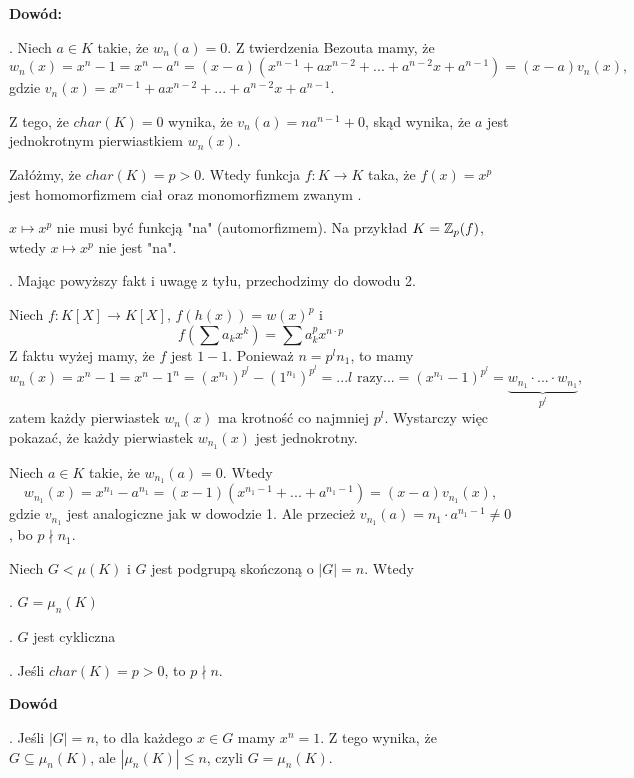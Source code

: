 \textbf{Dowód:}

. Niech $a\in K$ takie, że $w_n(a)=0$. Z twierdzenia Bezouta mamy, że
$$w_n(x)=x^n-1=x^n-a^n=(x-a)(x^{n-1}+ax^{n-2}+...+a^{n-2}x+a^{n-1})=(x-a)v_n(x),$$
gdzie $v_n(x)=x^{n-1}+ax^{n-2}+...+a^{n-2}x+a^{n-1}$.

Z tego, że $char(K)=0$ wynika, że $v_n(a)=na^{n-1}+0$, skąd wynika, że $a$ jest jednokrotnym pierwiastkiem $w_n(x)$.

\begin{fakt}
    Załóżmy, że $char(K)=p>0$. Wtedy funkcja $f:K\to K$ taka, że $f(x)=x^p$ jest homomorfizmem ciał oraz monomorfizmem zwanym .
\end{fakt}

\begin{uwaga}
    $x\mapsto x^p$ nie musi być funkcją "na" (automorfizmem). Na przykład $K=\mathbb{Z}_p(f)$, wtedy $x\mapsto x^p$ nie jest "na".
\end{uwaga}

. Mając powyższy fakt i uwagę z tyłu, przechodzimy do dowodu 2.

Niech $f:K[X]\to K[X]$, $f(h(x))=w(x)^p$ i 
$$f(\sum a_kx^k)=\sum a_k^px^{n\cdot p}$$
Z faktu wyżej mamy, że $f$ jest $1-1$. Ponieważ $n=p^ln_1$, to mamy 
$$w_n(x)=x^n-1=x^n-1^n=(x^{n_1})^{p^l}-(1^{n_1})^{p^l}=...l\text{ razy}...=(x^{n_1}-1)^{p^l}=\underbrace{w_{n_1}\cdot...\cdot w_{n_1}}_{p^l},$$
zatem każdy pierwiastek $w_n(x)$ ma krotność co najmniej $p^l$. Wystarczy więc pokazać, że każdy pierwiastek $w_{n_1}(x)$ jest jednokrotny.

Niech $a\in K$ takie, że $w_{n_1}(a)=0$. Wtedy 
$$w_{n_1}(x)=x^{n_1}-a^{n_1}=(x-1)(x^{n_1-1}+...+a^{n_1-1})=(x-a)v_{n_1}(x),$$
gdzie $v_{n_1}$ jest analogiczne jak w dowodzie 1. Ale przecież $v_{n_1}(a)=n_1\cdot a^{n_1-1}\neq0$, bo $p\nmid n_1$.

\begin{tw}
    Niech $G<\mu(K)$ i $G$ jest podgrupą skończoną o $|G|=n$. Wtedy

. $G=\mu_n(K)$

. $G$ jest cykliczna

. Jeśli $char(K)=p>0$, to $p\nmid n$.
\end{tw}

\textbf{Dowód}

. Jeśli $|G|=n$, to dla każdego $x\in G$ mamy $x^n=1$. Z tego wynika, że $G\subseteq \mu_n(K)$, ale $|\mu_n(K)|\leq n$, czyli $G=\mu_n(K)$.

